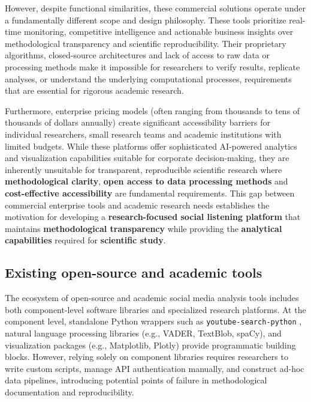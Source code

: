 However, despite functional similarities, these commercial solutions operate under a fundamentally different scope and design philosophy. These tools prioritize real-time monitoring, competitive intelligence and actionable business insights over methodological transparency and scientific reproducibility. Their proprietary algorithms, closed-source architectures and lack of access to raw data or processing methods make it impossible for researchers to verify results, replicate analyses, or understand the underlying computational processes, requirements that are essential for rigorous academic research.

Furthermore, enterprise pricing models (often ranging from thousands to tens of thousands of dollars annually) create significant accessibility barriers for individual researchers, small research teams and academic institutions with limited budgets. While these platforms offer sophisticated AI-powered analytics and visualization capabilities suitable for corporate decision-making, they are inherently unsuitable for transparent, reproducible scientific research where
\textbf{methodological clarity}, \textbf{open access to data processing methods} and \textbf{cost-effective accessibility} are fundamental requirements. This gap between commercial enterprise tools and academic research needs establishes the motivation for developing a \textbf{research-focused social listening platform} that maintains \textbf{methodological transparency} while providing the \textbf{analytical capabilities} required for \textbf{scientific study}.

\subsection{Existing open-source and academic tools}

The ecosystem of open-source and academic social media analysis tools includes both component-level software libraries and specialized research platforms. At the component level, standalone Python wrappers such as \texttt{youtube-search-python} \autocite{youtube_search_python}, natural language processing libraries (e.g., VADER, TextBlob, spaCy), and visualization packages (e.g., Matplotlib, Plotly) provide programmatic building blocks. However, relying solely on component libraries requires researchers to write custom scripts, manage API authentication manually, and construct ad-hoc data pipelines, introducing potential points of failure in methodological documentation and reproducibility.

